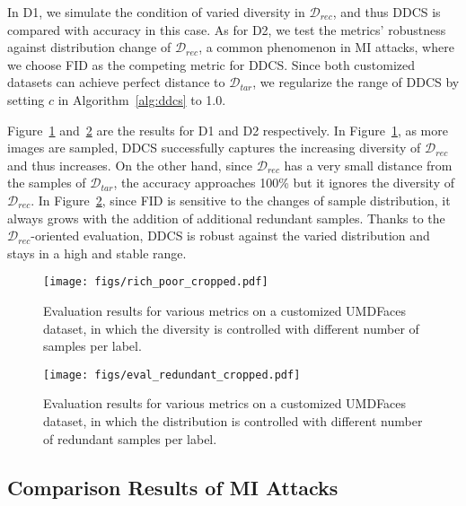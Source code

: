 In D1, we simulate the condition of varied diversity in $\mathcal{D}_{rec}$, and thus DDCS is compared with accuracy in this case.
As for D2, we test the metrics' robustness against distribution change of $\mathcal{D}_{rec}$, a common phenomenon in MI attacks, where we choose FID as the competing metric for DDCS.
Since both customized datasets can achieve perfect distance to $\mathcal{D}_{tar}$, we regularize the range of DDCS by setting $c$ in Algorithm~\ref{alg:ddcs} to 1.0.

Figure~\ref{fig:rich_poor} and~\ref{fig:eval_redundant} are the results for D1 and D2 respectively.
In Figure~\ref{fig:rich_poor}, as more images are sampled, DDCS successfully captures the increasing diversity of $\mathcal{D}_{rec}$ and thus increases. On the other hand, since $\mathcal{D}_{rec}$ has a very small distance from the samples of $\mathcal{D}_{tar}$, the accuracy approaches 100\% but it ignores the diversity of $\mathcal{D}_{rec}$.
In Figure~\ref{fig:eval_redundant}, since FID is sensitive to the changes of sample distribution, it always grows with the addition of additional redundant samples. Thanks to the $\mathcal{D}_{rec}$-oriented evaluation, DDCS is robust against the varied distribution and stays in a high and stable range.

\begin{figure}[htb]%
	\centering
	\texttt{[image: figs/rich\_poor\_cropped.pdf]}
 \vspace{-0.1in}
	\caption{Evaluation results for various metrics on a customized UMDFaces dataset, in which the diversity is controlled with different number of samples per label. }
	\label{fig:rich_poor}
 \vspace{-0.2in}
\end{figure}

\begin{figure}[htb]%
	\centering
	\texttt{[image: figs/eval\_redundant\_cropped.pdf]}
 \vspace{-0.1in}
	\caption{Evaluation results for various metrics on a customized UMDFaces dataset, in which the distribution is controlled with different number of redundant samples per label. }
	\label{fig:eval_redundant}
\end{figure}


\subsection{Comparison Results of MI Attacks}

